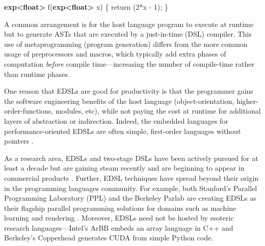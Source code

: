 \documentclass[conference]{IEEEtran}
\newcommand{\kw}[1]{{\textbf{#1}}}
\newcommand{\rnote}[1]{\begin{itemize}\item{\textcolor{blue}{#1}}\end{itemize}}
\newcommand{\rnote}[1]{}
\begin{document}
\vspace{1mm}
\begin{code}
  \kw{exp<float>} f(\kw{exp<float>} x) \{
    return (2*x - 1);
  \}
\end{code}

A common arrangement is for the host language program to execute at
runtime but to generate ASTs that are executed by a just-in-time
(DSL) compiler.  This use of metaprogramming (program generation)
differs from the more common usage of preprocessors and 
macros, which typically add extra
phases of computation {\em before}  compile time---increasing
the number of compile-time rather than runtime phases.



One reason that EDSLs are good for productivity is that the programmer
gains the software engineering benefits of the host language
(object-orientation, higher-order-functions, modules, etc), while not
paying the cost at runtime for additional layers of abstraction or
indirection.  Indeed, the embedded languages for 
performance-oriented EDSLs are often simple, first-order
languages without pointers \cite{wavescript, Accelerate}.


As a research area, EDSLs and two-stage DSLs have been actively pursued for at least a
decade \cite{vertigo, wavescript} but are gaining steam
recently 
\cite{copperhead, stanford-ppl} 
and are beginning to appear in
commercial products \cite{ArBB}.
%
Further, EDSL techniques have spread beyond their origin in 
 the programming languages community.
% 
For example, both Stanford's Parallel Programming Laboratory (PPL) and
the Berkeley Parlab are creating EDSLs as their flagship parallel
programming solutions for domains such as machine learning and
rendering \cite{stanford-ppl}.
  Moreover, EDSLs need not be hosted by esoteric research languages---Intel's
 ArBB embeds an array language in C++ and Berkeley's
Copperhead \cite{copperhead} generates CUDA from simple Python code.

\end{document}

